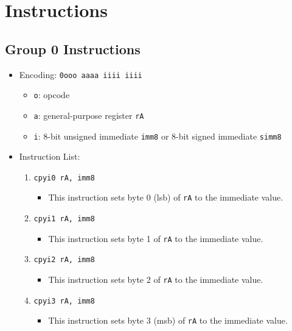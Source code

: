 \documentclass{article}
\begin{document}
\section{Instructions}
	\subsection{Group 0 Instructions}
		\begin{itemize}
		\item Encoding:  \texttt{0ooo aaaa iiii iiii}
			\begin{itemize}
			\item \texttt{o}:  opcode
			\item \texttt{a}:  general-purpose register \texttt{rA}
			\item \texttt{i}:  8-bit unsigned immediate \texttt{imm8} or
				8-bit signed immediate \texttt{simm8}
			\end{itemize}
		\item Instruction List:
			\begin{enumerate}
			\item \texttt{cpyi0 rA, imm8}
				\begin{itemize}
				\item This instruction sets byte 0 (lsb) of \texttt{rA} to
					the immediate value.
				\end{itemize}
			\item \texttt{cpyi1 rA, imm8}
				\begin{itemize}
				\item This instruction sets byte 1 of \texttt{rA} to the
					immediate value.
				\end{itemize}
			\item \texttt{cpyi2 rA, imm8}
				\begin{itemize}
				\item This instruction sets byte 2 of \texttt{rA} to the
					immediate value.
				\end{itemize}
			\item \texttt{cpyi3 rA, imm8}
				\begin{itemize}
				\item This instruction sets byte 3 (msb) of \texttt{rA} to
					the immediate value.
				\end{itemize}


\end{enumerate}
\end{itemize}
\end{document}
